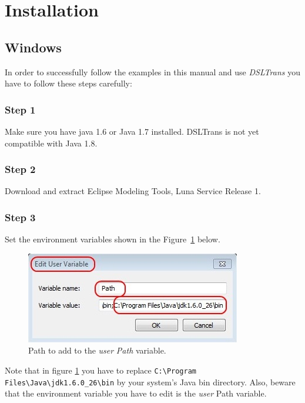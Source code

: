 ﻿\section{Installation}
\label{sec:installation}

\subsection{Windows}

In order to successfully follow the examples in this manual and use
\emph{DSLTrans} you have to follow these steps carefully:

\subsubsection{Step 1}
Make sure you have java 1.6 or Java 1.7 installed. DSLTrans is not yet compatible with Java 1.8.

\subsubsection{Step 2}

Download and extract Eclipse Modeling Tools, Luna Service Release 1.

\subsubsection{Step 3}
Set the environment variables shown in the Figure~\ref{fig:path_user} below.

\begin{figure}[H]
\begin{center}
  \includegraphics[scale=0.9]{imgs/path_user.jpg}
  \caption{Path to add to the \emph{user} \emph{Path} variable.}
  \label{fig:path_user}
\end{center}
\end{figure}

Note that in figure \ref{fig:path_user} you have to replace \verb=C:\Program Files\Java\jdk1.6.0_26\bin=
by your system's Java bin directory. Also, beware that the environment variable you have to edit is the \emph{user} Path variable.

